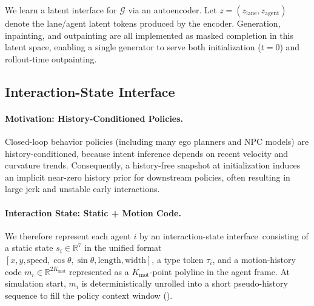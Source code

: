 \documentclass{article}
\newcommand{\MotionVAE}{motion-aware gated VAE}
\newcommand{\InteractionState}{interaction-state interface}
\theoremstyle{plain}
\theoremstyle{definition}
\theoremstyle{remark}
\begin{document}
We learn a latent interface for \(\mathcal{G}\) via an autoencoder.
Let \(z=(z_{\mathrm{lane}}, z_{\mathrm{agent}})\) denote the lane/agent latent tokens produced by the encoder.
Generation, inpainting, and outpainting are all implemented as masked completion in this latent space, enabling a single generator to serve both initialization (\(t=0\)) and rollout-time outpainting.


\subsection{Interaction-State Interface}
\label{sec:vae}
\paragraph{Motivation: History-Conditioned Policies.}
Closed-loop behavior policies (including many ego planners and NPC models) are history-conditioned,
because intent inference depends on recent velocity and curvature trends.
Consequently, a history-free snapshot at initialization induces an implicit near-zero history prior for downstream policies,
often resulting in large jerk and unstable early interactions.

\paragraph{Interaction State: Static + Motion Code.}
We therefore represent each agent \(i\) by an \InteractionState\ consisting of
a static state \(s_i\in\mathbb{R}^{7}\) in the unified format
\([x, y, \mathrm{speed}, \cos\theta, \sin\theta, \mathrm{length}, \mathrm{width}]\),
a type token \(\tau_i\), and a motion-history code \(m_i\in\mathbb{R}^{2K_{\mathrm{mot}}}\) represented as a \(K_{\mathrm{mot}}\)-point polyline in the agent frame.
At simulation start, \(m_i\) is deterministically unrolled into a short pseudo-history sequence to fill the policy context window ().
\end{document}
